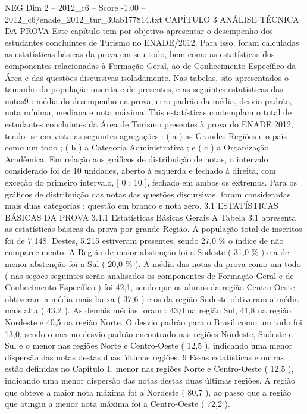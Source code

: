 \begin{textsample}{NEG Dim 2 – 2012\_c6 – Score -1.00 – 2012\_c6/enade\_2012\_tur\_30ab177814.txt}  \label{ex:f2_neg_184}
CAPÍTULO 3 ANÁLISE TÉCNICA DA PROVA Este capítulo tem por objetivo apresentar o desempenho dos estudantes concluintes de Turismo no ENADE/2012.
Para isso, foram calculadas as estatísticas básicas da prova em seu todo, bem como as estatísticas dos componentes relacionadas à Formação Geral, ao de Conhecimento Específico da Área e das questões discursivas isoladamente.
Nas tabelas, são apresentados o tamanho da população inscrita e de presentes, e as seguintes estatísticas das notas9 : média do desempenho na prova, erro padrão da média, desvio padrão, nota mínima, mediana e nota máxima.
Tais estatísticas contemplam o total de estudantes concluintes da Área de Turismo presentes à prova do ENADE 2012, tendo -se em vista as seguintes agregações : ( a ) as Grandes Regiões e o país como um todo ; ( b ) a Categoria Administrativa ; e ( c ) a Organização Acadêmica.
Em relação aos gráficos de distribuição de notas, o intervalo considerado foi de 10 unidades, aberto à esquerda e fechado à direita, com exceção do primeiro intervalo, [ 0 ; 10 ], fechado em ambos os extremos.
Para os gráficos de distribuição das notas das questões discursivas, foram consideradas mais duas categorias : questão em branco e nota zero. 3.1 ESTATÍSTICAS BÁSICAS DA PROVA 3.1.1 Estatísticas Básicas Gerais A Tabela 3.1 apresenta as estatísticas básicas da prova por grande Região.
A população total de inscritos foi de 7.148.
Destes, 5.215 estiveram presentes, sendo 27,0 \% o índice de não comparecimento.
A Região de maior abstenção foi a Sudeste ( 31,0 \% ) e a de menor abstenção foi a Sul ( 20,0 \% ).
A média das notas da prova como um todo ( nas seções seguintes serão analisados os componentes de Formação Geral e de Conhecimento Específico ) foi 42,1, sendo que os alunos da região Centro-Oeste obtiveram a média mais baixa ( 37,6 ) e os da região Sudeste obtiveram a média mais alta ( 43,2 ).
As demais médias foram : 43,0 na região Sul, 41,8 na região Nordeste e 40,5 na região Norte.
O desvio padrão para o Brasil como um todo foi 13,0, sendo o mesmo desvio padrão encontrado nas regiões Nordeste, Sudeste e Sul e o menor nas regiões Norte e Centro-Oeste ( 12,5 ), indicando uma menor dispersão das notas destas duas últimas regiões. 9 Essas estatísticas e outras estão definidas no Capítulo 1. menor nas regiões Norte e Centro-Oeste ( 12,5 ), indicando uma menor dispersão das notas destas duas últimas regiões.
A região que obteve a maior nota máxima foi a Nordeste ( 80,7 ), ao passo que a região que atingiu a menor nota máxima foi a Centro-Oeste ( 72,2 ).

\end{textsample}
